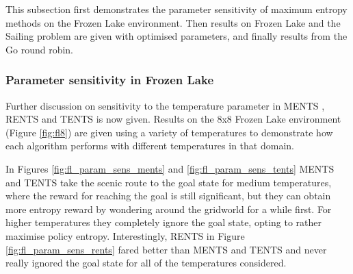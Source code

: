 

        This subsection first demonstrates the parameter sensitivity of maximum entropy methods on the Frozen Lake environment. Then results on Frozen Lake and the Sailing problem are given with optimised parameters, and finally results from the Go round robin.







        \subsubsection{Parameter sensitivity in Frozen Lake} \label{sec:param_sens_fl}


            Further discussion on sensitivity to the temperature parameter in MENTS \cite{ments}, RENTS and TENTS \cite{rentsmytents} is now given. Results on the 8x8 Frozen Lake environment (Figure \ref{fig:fl8}) are given using a variety of temperatures to demonstrate how each algorithm performs with different temperatures in that domain. 


            In Figures \ref{fig:fl_param_sens_ments} and \ref{fig:fl_param_sens_tents} MENTS and TENTS take the scenic route to the goal state for medium temperatures, where the reward for reaching the goal is still significant, but they can obtain more entropy reward by wondering around the gridworld for a while first. For higher temperatures they completely ignore the goal state, opting to rather maximise policy entropy. Interestingly, RENTS in Figure \ref{fig:fl_param_sens_rents} fared better than MENTS and TENTS and never really ignored the goal state for all of the temperatures considered.

